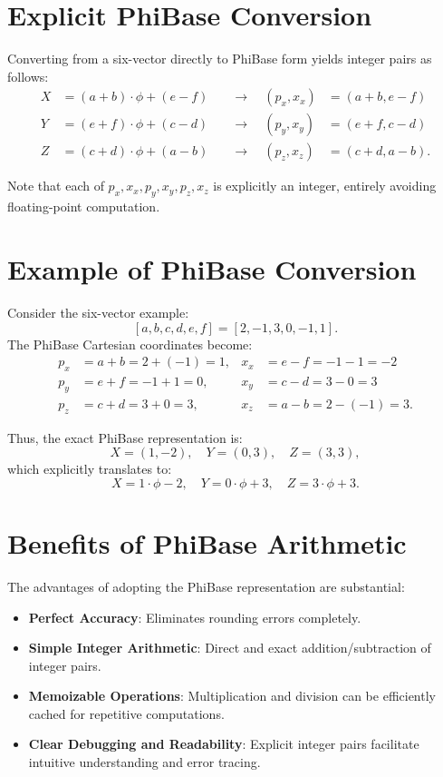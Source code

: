 \documentclass{article}
\begin{document}
\section*{Explicit PhiBase Conversion}

Converting from a six-vector directly to PhiBase form yields integer pairs as follows:
\[
\begin{aligned}
X &= (a+b)\cdot\phi + (e - f) \quad &\rightarrow\quad (p_x, x_x) &= (a+b, e-f) \\
Y &= (e+f)\cdot\phi + (c - d) \quad &\rightarrow\quad (p_y, x_y) &= (e+f, c-d) \\
Z &= (c+d)\cdot\phi + (a - b) \quad &\rightarrow\quad (p_z, x_z) &= (c+d, a-b).
\end{aligned}
\]

Note that each of $p_x, x_x, p_y, x_y, p_z, x_z$ is explicitly an integer, entirely avoiding floating-point computation.

\section*{Example of PhiBase Conversion}

Consider the six-vector example:
\[
[a,b,c,d,e,f] = [2, -1, 3, 0, -1, 1].
\]
The PhiBase Cartesian coordinates become:
\begin{align*}
p_x &= a+b = 2 + (-1) = 1, & x_x &= e - f = -1 - 1 = -2 \\
p_y &= e+f = -1 + 1 = 0, & x_y &= c - d = 3 - 0 = 3 \\
p_z &= c+d = 3 + 0 = 3, & x_z &= a - b = 2 - (-1) = 3.
\end{align*}

Thus, the exact PhiBase representation is:
\[
X = (1, -2),\quad Y = (0, 3),\quad Z = (3, 3),
\]
which explicitly translates to:
\[
X = 1\cdot\phi - 2,\quad Y = 0\cdot\phi + 3,\quad Z = 3\cdot\phi + 3.
\]

\section*{Benefits of PhiBase Arithmetic}

The advantages of adopting the PhiBase representation are substantial:
\begin{itemize}
\item \textbf{Perfect Accuracy}: Eliminates rounding errors completely.
\item \textbf{Simple Integer Arithmetic}: Direct and exact addition/subtraction of integer pairs.
\item \textbf{Memoizable Operations}: Multiplication and division can be efficiently cached for repetitive computations.
\item \textbf{Clear Debugging and Readability}: Explicit integer pairs facilitate intuitive understanding and error tracing.
\end{itemize}
\end{document}

